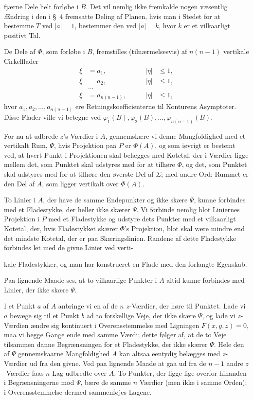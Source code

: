 \documentclass{article}
\begin{document}
fjærne Dele helt forløbe i $B$. Det vil nemlig ikke fremkalde nogen væsentlig Ændring i den i §~4 fremsatte Deling af Planen, hvis man i Stedet for at bestemme $T$ ved $|a| = 1$, bestemmer den ved $|a| = k$, hvor $k$ er et vilkaarligt positivt Tal.

De Dele af $\Phi$, som forløbe i $B$, fremstilles (tilnærmelsesvis) af $n(n - 1)$ vertikale Cirkelflader
\[
\begin{aligned}
\xi &= a_1, \qquad &|\eta| &\le 1, \\
\xi &= a_2, \qquad &|\eta| &\le 1, \\
&\dots \\
\xi &= a_{n(n-1)}, \qquad &|\eta| &\le 1,
\end{aligned}
\]
hvor $a_1, a_2, \dots, a_{n(n-1)}$ ere Retningskoefficienterne til Konturens Asymptoter. Disse Flader ville vi betegne ved $\varphi_1(B), \varphi_2(B), \dots, \varphi_{n(n-1)}(B)$.

For nu at udbrede $z$'s Værdier i $A$, gennemskære vi denne Mangfoldighed med et vertikalt Rum, $\Psi$, hvis Projektion paa $P$ er $\Phi(A)$, og som iøvrigt er bestemt ved, at hvert Punkt i Projektionen skal belægges med Kotetal, der i Værdier ligge mellem det, som Punktet skal udstyres med for at tilhøre $\Phi$, og det, som Punktet skal udstyres med for at tilhøre den øverste Del af $\Sigma$; med andre Ord: Rummet er den Del af $A$, som ligger vertikalt over $\Phi(A)$.

To Linier i $A$, der have de samme Endepunkter og ikke skære $\Psi$, kunne forbindes med et Fladestykke, der heller ikke skærer $\Psi$. Vi forbinde nemlig blot Liniernes Projektion i $P$ med et Fladestykke og udstyre dets Punkter med et vilkaarligt Kotetal, der, hvis Fladestykket skærer $\Phi$'s Projektion, blot skal være mindre end det mindste Kotetal, der er paa Skæringslinien. Randene af dette Fladestykke forbindes let med de givne Linier ved verti-

kale Fladestykker, og man har konstrueret en Flade med den forlangte Egenskab.

Paa lignende Maade ses, at to vilkaarlige Punkter i $A$ altid kunne forbindes med Linier, der ikke skære $\Psi$.

I et Punkt $a$ af $A$ anbringe vi en af de $n$ $z$-Værdier, der høre til Punktet. Lade vi $a$ bevæge sig til et Punkt $b$ ad to forskellige Veje, der ikke skære $\Psi$, og lade vi $z$-Værdien ændre sig kontinuert i Overensstemmelse med Ligningen $F(x, y, z) = 0$, maa vi begge Gange ende med samme Værdi; dette følger af, at de to Veje tilsammen danne Begrænsningen for et Fladestykke, der ikke skærer $\Psi$. Hele den af $\Psi$ gennemskaarne Mangfoldighed $A$ kan altsaa eentydig belægges med $z$-Værdier ud fra den givne. Ved paa lignende Maade at gaa ud fra de $n - 1$ andre $z$-Værdier faas $n$ Lag udbredte over $A$. To Punkter, der ligge lige overfor hinanden i Begrænsningerne mod $\Psi$, bære de samme $n$ Værdier (men ikke i samme Orden); i Overensstemmelse dermed sammenføjes Lagene.
\end{document}
